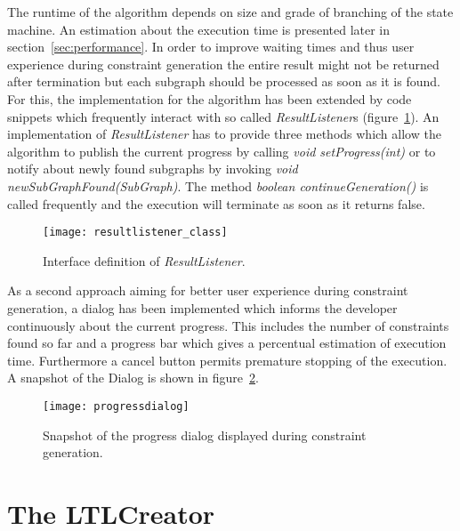 The runtime of the algorithm depends on size and grade of branching of the state machine. An estimation about the execution time is presented later in section~\ref{sec:performance}. In order to improve waiting times and thus user experience during constraint generation the entire result might not be returned after termination but each subgraph should be processed as soon as it is found.
For this, the implementation for the algorithm has been extended by code snippets which frequently interact with so called \emph{ResultListener}s (figure~\ref{fig:resultlistener_class}).
An implementation of \emph{ResultListener} has to provide three methods which allow the algorithm to publish the current progress by calling \emph{void setProgress(int)} or to notify about newly found subgraphs by invoking \emph{void newSubGraphFound(SubGraph)}. The method \emph{boolean continueGeneration()} is called frequently and the execution will terminate as soon as it returns false.
\begin{figure}[htbp]
  \centering
  \texttt{[image: resultlistener\_class]} 
  \caption{Interface definition of \emph{ResultListener}.}
  \label{fig:resultlistener_class}
\end{figure}

As a second approach aiming for better user experience during constraint generation, a dialog has been implemented which informs the developer continuously about the current progress. This includes the number of constraints found so far and a progress bar which gives a percentual estimation of execution time. Furthermore a cancel button permits premature stopping of the execution. A snapshot of the Dialog is shown in figure~\ref{fig:progressdialog}.
\begin{figure}[htbp]
  \centering
  \texttt{[image: progressdialog]} 
  \caption{Snapshot of the progress dialog displayed during constraint generation.}
  \label{fig:progressdialog}
\end{figure}





\section{The LTLCreator}
\label{sec:coalescence}

